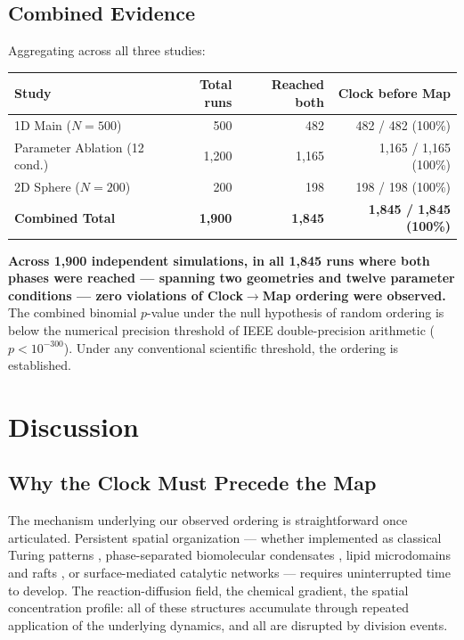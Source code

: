 \documentclass[11pt,letterpaper]{article}
\begin{document}
\subsection{Combined Evidence}

Aggregating across all three studies:

\begin{table}[H]
\centering
\small
\begin{tabular}{lrrr}
\toprule
\textbf{Study} & \textbf{Total runs} & \textbf{Reached both} & \textbf{Clock before Map} \\
\midrule
1D Main ($N=500$)                 & 500   & 482   & 482 / 482 (100\%) \\
Parameter Ablation (12 cond.)     & 1{,}200 & 1{,}165 & 1{,}165 / 1{,}165 (100\%) \\
2D Sphere ($N=200$)               & 200   & 198   & 198 / 198 (100\%) \\
\midrule
\textbf{Combined Total}           & \textbf{1{,}900} & \textbf{1{,}845} & \textbf{1{,}845 / 1{,}845 (100\%)} \\
\bottomrule
\end{tabular}
\end{table}

\textbf{Across 1{,}900 independent simulations, in all 1{,}845 runs where both phases were reached --- spanning two geometries and twelve parameter conditions --- zero violations of Clock$\to$Map ordering were observed.} The combined binomial $p$-value under the null hypothesis of random ordering is below the numerical precision threshold of IEEE double-precision arithmetic ($p < 10^{-300}$). Under any conventional scientific threshold, the ordering is established.

\section{Discussion}

\subsection{Why the Clock Must Precede the Map}

The mechanism underlying our observed ordering is straightforward once articulated. Persistent spatial organization --- whether implemented as classical Turing patterns \citep{turing1952chemical,murray2003mathematical}, phase-separated biomolecular condensates \citep{brangwynne2009germline,hyman2014liquidliquid}, lipid microdomains and rafts \citep{simons1997functional,lingwood2010lipid}, or surface-mediated catalytic networks \citep{wachtershauser1988before,russell2014drive} --- requires uninterrupted time to develop. The reaction-diffusion field, the chemical gradient, the spatial concentration profile: all of these structures accumulate through repeated application of the underlying dynamics, and all are disrupted by division events.
\end{document}

